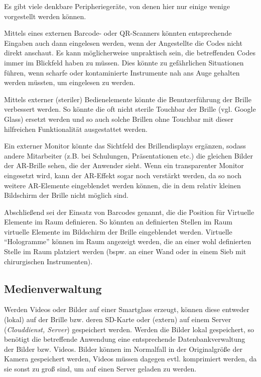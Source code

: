 Es gibt viele denkbare Peripheriegeräte, von denen hier nur einige wenige vorgestellt werden können.

Mittels eines externen Barcode- oder QR-Scanners könnten entsprechende Eingaben auch dann eingelesen werden, wenn der Angestellte die Codes nicht direkt anschaut. Es kann möglicherweise unpraktisch sein, die betreffenden Codes immer im Blickfeld haben zu müssen. Dies könnte zu gefährlichen Situationen führen, wenn scharfe oder kontaminierte Instrumente nah ans Auge gehalten werden müssten, um eingelesen zu werden.

Mittels externer (steriler) Bedienelemente könnte die Benutzerführung der Brille verbessert werden. So könnte die oft nicht sterile Touchbar der Brille (vgl. Google Glass) ersetzt werden und so auch solche Brillen ohne Touchbar mit dieser hilfreichen Funktionalität ausgestattet werden.

Ein externer Monitor könnte das Sichtfeld des Brillendisplays ergänzen, sodass andere Mitarbeiter (z.B. bei Schulungen, Präsentationen etc.) die gleichen Bilder der AR-Brille sehen, die der Anwender sieht. Wenn ein transparenter Monitor eingesetzt wird, kann der AR-Effekt sogar noch verstärkt werden, da so noch weitere AR-Elemente eingeblendet werden können, die in dem relativ kleinen Bildschirm der Brille nicht möglich sind.

Abschließend sei der Einsatz von Barcodes genannt, die die Position für Virtuelle Elemente im Raum definieren. So könnten an definierten Stellen im Raum virtuelle Elemente im Bildschirm der Brille eingeblendet werden. Virtuelle \enquote{Hologramme} können im Raum angezeigt werden, die an einer wohl definierten Stelle im Raum platziert werden (bspw. an einer Wand oder in einem Sieb mit chirurgischen Instrumenten).
%
%
%
%
%
%
\subsection{Medienverwaltung}
\label{sec:Medienverwaltung}
Werden Videos oder Bilder auf einer Smartglass erzeugt, können diese entweder (lokal) auf der Brille bzw. deren SD-Karte oder (extern) auf einem Server (\emph{Clouddienst, Server}) gespeichert werden. Werden die Bilder lokal gespeichert, so benötigt die betreffende Anwendung eine entsprechende Datenbankverwaltung der Bilder bzw. Videos. Bilder können im Normalfall in der Originalgröße der Kamera gespeichert werden, Videos müssen dagegen evtl. komprimiert werden, da sie sonst zu groß sind, um auf einen Server geladen zu werden. 


